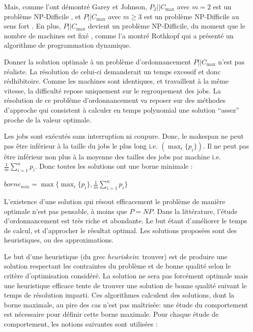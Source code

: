 \documentclass[a4paper,12pt]{report}
\theoremstyle{plain}				%
\theoremstyle{definition}				%
\newcommand\problemGrahamPII{$P_2||C_{\max}$\xspace}	%
\newcommand\problemGrahamP{$P||C_{\max}$\xspace}
\newcommand{\fco}[1]{\todo[author=FCO,color=teal,inline]{#1}}
\begin{document}
Mais, comme l'ont démontré Garey et Johnson, 
  \problemGrahamPII avec $m = 2$ est un problème NP-Difficile \cite{garey1978strong}, et 
  \problemGrahamP avec $m \geq 3$ est un problème NP-Difficile au sens fort \cite{garey1982computers}.
En plus, \problemGrahamP devient un problème NP-Difficile, du moment que le nombre de machines 
  est fixé \cite{chen1999potts}, comme l'a montré Rothkopf \cite{rothkopf1966scheduling} qui a 
  présenté un algorithme de programmation dynamique.\fco{voir le type d'algo pseudo-polynomial ?}

Donner la solution optimale à un problème d'ordonnancement \problemGrahamP n'est pas réaliste. 
La résolution de celui-ci demanderait un temps excessif et donc rédhibitoire.
Comme les machines sont identiques, et travaillent à la même vitesse, la difficulté repose uniquement 
  sur le regroupement des jobs.
La résolution de ce problème d'ordonnancement va reposer sur des méthodes d'approche qui consistent à 
  calculer en temps polynomial une solution ``assez'' proche de la valeur optimale.

Les jobs sont exécutés sans interruption ni coupure. Donc, le makespan ne peut pas être inférieur à 
  la taille du jobs le plus long i.e. $(\max_i\{p_i\})$.
  Il ne peut pas être inférieur non plus à la moyenne des tailles des jobs par machine
  i.e. $\frac{1}{m} \sum_{i=1}^{n} p_i$.
Donc toutes les solutions ont une borne minimale \cite{mcnaughton1959scheduling}: \\

  \begin{center}
  $borne_{min} = \max \{ \max_i\{p_i\}, \frac{1}{m} \sum_{i=1}^{n} p_i \}$
  \label{borneMini}
  \end{center}

L'existence d'une solution qui résout efficacement le problème de manière optimale
  n'est pas pensable, à moins que $P = NP$.
Dans la littérature, l'étude d'ordonnancement est très riche et abondante. 
Le but étant d'améliorer le temps de calcul, et d'approcher le résultat optimal. 
Les solutions proposées sont des heuristiques, ou des approximations.

Le but d'une heuristique (du grec \emph{heuriskein}: trouver) est 
  de produire une solution respectant les contraintes du problème et 
  de bonne qualité selon le critère d'optimisation considéré. 
La solution ne sera pas forcément optimale mais une heuristique efficace tente de trouver une 
  solution de bonne qualité suivant le temps de résolution imparti.
Ces algorithmes calculent des solutions, dont la borne maximale, au pire des cas n'est pas maîtrisée: 
une étude du comportement est nécessaire pour définir cette borne maximale.  
Pour chaque étude de comportement, les notions suivantes sont utilisées :
\end{document}
